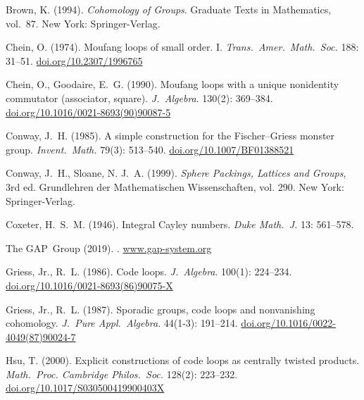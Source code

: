 \documentclass{article}
\theoremstyle{plain}
\theoremstyle{definition}
\begin{document}
% 
% 


\begin{thebibliography}{10}


Brown, K. (1994).
\newblock \emph{Cohomology of Groups}. Graduate Texts in  Mathematics, vol.~87.
\newblock New York: Springer-Verlag.

Chein, O. (1974).
\newblock Moufang loops of small order. {I}.
\newblock \emph{Trans.\ Amer.\ Math.\ Soc.} 188: 31--51.
\newblock \url{doi.org/10.2307/1996765}

Chein, O., Goodaire, E.~G. (1990).
\newblock Moufang loops with a unique nonidentity commutator (associator,
  square).
\newblock \emph{J.\ Algebra}. 130(2): 369--384.
\newblock \url{doi.org/10.1016/0021-8693(90)90087-5}

Conway, J.~H. (1985).
\newblock A simple construction for the {F}ischer--{G}riess monster group.
\newblock \emph{Invent.\ Math.} 79(3): 513--540.
\newblock \url{doi.org/10.1007/BF01388521}

Conway, J.~H., Sloane, N. J.~A. (1999).
\newblock \emph{Sphere Packings, Lattices and Groups}, 3rd ed. Grundlehren der Mathematischen Wissenschaften, vol. 290.
\newblock New York: Springer-Verlag.

Coxeter, H.\ S.\ M. (1946).
\newblock Integral Cayley numbers.
\newblock \emph{Duke Math.\ J.} 13: 561--578.

The GAP~Group (2019).
. 
\newblock \url{www.gap-system.org}

Griess, Jr., R.~L. (1986).
\newblock Code loops.
\newblock \emph{J.\ Algebra}. 100(1): 224--234.
\newblock \url{doi.org/10.1016/0021-8693(86)90075-X}

Griess, Jr., R.~L. (1987).
\newblock Sporadic groups, code loops and nonvanishing cohomology.
\newblock \emph{J.\ Pure Appl.\ Algebra}. 44(1-3): 191--214.
\newblock \url{doi.org/10.1016/0022-4049(87)90024-7}


Hsu, T. (2000).
\newblock Explicit constructions of code loops as centrally twisted products.
\newblock \emph{Math.\ Proc. Cambridge Philos.\ Soc.} 128(2): 223--232.
\newblock \url{doi.org/10.1017/S030500419900403X}


\end{thebibliography}
\end{document}

